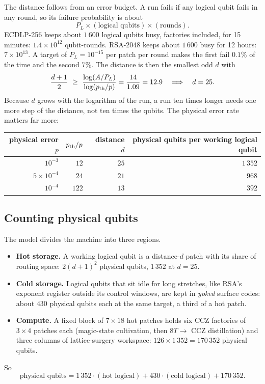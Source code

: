 \documentclass[11pt]{article}
\theoremstyle{plain}
\theoremstyle{remark}
\begin{document}
The distance follows from an error budget. A run fails if any logical qubit fails in any round, so
its failure probability is about
\[ P_L\times(\text{logical qubits})\times(\text{rounds}) . \]
ECDLP-256 keeps about $1\,600$ logical qubits busy, factories included, for 15 minutes:
$1.4\times10^{12}$ qubit-rounds. RSA-2048 keeps about $1\,600$ busy for 12 hours:
$7\times10^{13}$. A target of $P_L=10^{-15}$ per patch per round makes the first fail $0.1\%$ of
the time and the second $7\%$. The distance is then the smallest odd $d$ with
\[ \frac{d+1}{2}\ \ge\ \frac{\log(A/P_L)}{\log(p_{\rm th}/p)}=\frac{14}{1.09}=12.9
   \quad\Longrightarrow\quad d=25 . \]
Because $d$ grows with the logarithm of the run, a run ten times longer needs one more step of the
distance, not ten times the qubits. The physical error rate matters far more:

\begin{center}\small
\begin{tabular}{rrrr}
\toprule
physical error $p$ & $p_{\rm th}/p$ & distance $d$ & physical qubits per working logical qubit\\
\midrule
$10^{-3}$ & $12$ & $25$ & $1\,352$\\
$5\times10^{-4}$ & $24$ & $21$ & $968$\\
$10^{-4}$ & $122$ & $13$ & $392$\\
\bottomrule
\end{tabular}
\end{center}

\subsection{Counting physical qubits}

The model divides the machine into three regions.
\begin{itemize}\setlength\itemsep{2pt}
\item \textbf{Hot storage.} A working logical qubit is a distance-$d$ patch with its share of
routing space: $2(d+1)^2$ physical qubits, $1\,352$ at $d=25$.
\item \textbf{Cold storage.} Logical qubits that sit idle for long stretches, like RSA's exponent
register outside its control windows, are kept in \emph{yoked} surface codes: about $430$ physical
qubits each at the same target, a third of a hot patch.
\item \textbf{Compute.} A fixed block of $7\times18$ hot patches holds six CCZ factories of
$3\times4$ patches each (magic-state cultivation, then $8T\to$ CCZ distillation) and three columns of
lattice-surgery workspace: $126\times1\,352=170\,352$ physical qubits.
\end{itemize}
So
\[ \text{physical qubits}=1\,352\cdot(\text{hot logical})+430\cdot(\text{cold logical})+170\,352 . \]
\end{document}

